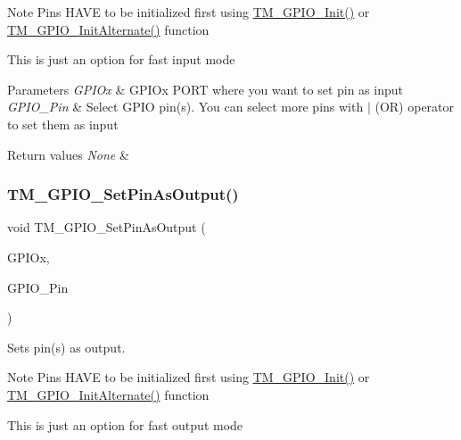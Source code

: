 \begin{DoxyNote}{Note}
Pins H\+A\+VE to be initialized first using \hyperlink{group___t_m___g_p_i_o___functions_ga7ea61719f45c8d46e56f636d7ffdf0d0}{T\+M\+\_\+\+G\+P\+I\+O\+\_\+\+Init()} or \hyperlink{group___t_m___g_p_i_o___functions_gac91349d1bf42b50463ebc2716130eb89}{T\+M\+\_\+\+G\+P\+I\+O\+\_\+\+Init\+Alternate()} function 

This is just an option for fast input mode 
\end{DoxyNote}

\begin{DoxyParams}{Parameters}
{\em G\+P\+I\+Ox} & G\+P\+I\+Ox P\+O\+RT where you want to set pin as input \\
\hline
{\em G\+P\+I\+O\+\_\+\+Pin} & Select G\+P\+IO pin(s). You can select more pins with $\vert$ (OR) operator to set them as input \\
\hline
\end{DoxyParams}

\begin{DoxyRetVals}{Return values}
{\em None} & \\
\hline
\end{DoxyRetVals}
\mbox{\label{group___t_m___g_p_i_o___functions_gabfa399cb17386714bd9c395a81b43035}} 
\subsubsection{\texorpdfstring{T\+M\+\_\+\+G\+P\+I\+O\+\_\+\+Set\+Pin\+As\+Output()}{TM\_GPIO\_SetPinAsOutput()}}
{\footnotesize\ttfamily void T\+M\+\_\+\+G\+P\+I\+O\+\_\+\+Set\+Pin\+As\+Output (\begin{DoxyParamCaption}\item[{G\+P\+I\+O\+\_\+\+Type\+Def $\ast$}]{G\+P\+I\+Ox,  }\item[{uint16\+\_\+t}]{G\+P\+I\+O\+\_\+\+Pin }\end{DoxyParamCaption})}



Sets pin(s) as output. 

\begin{DoxyNote}{Note}
Pins H\+A\+VE to be initialized first using \hyperlink{group___t_m___g_p_i_o___functions_ga7ea61719f45c8d46e56f636d7ffdf0d0}{T\+M\+\_\+\+G\+P\+I\+O\+\_\+\+Init()} or \hyperlink{group___t_m___g_p_i_o___functions_gac91349d1bf42b50463ebc2716130eb89}{T\+M\+\_\+\+G\+P\+I\+O\+\_\+\+Init\+Alternate()} function 

This is just an option for fast output mode 
\end{DoxyNote}

